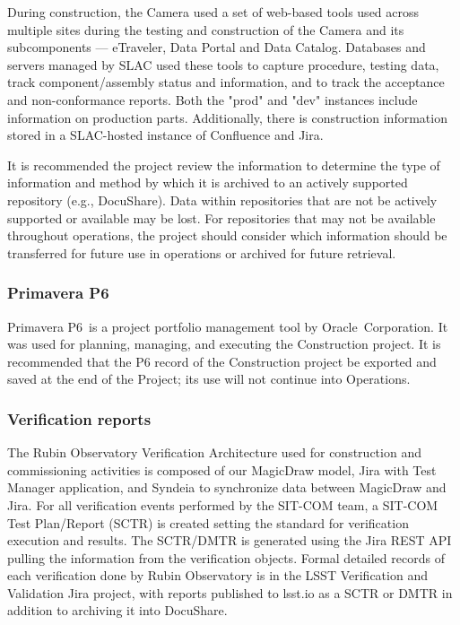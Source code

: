 During construction, the Camera used a set of web-based tools used across multiple sites during the testing and construction of the Camera and its subcomponents --- eTraveler, Data Portal and Data Catalog.
Databases and servers managed by SLAC used these tools to capture procedure, testing data, track component/assembly status and information, and to track the acceptance and non-conformance reports.
Both the "prod" and "dev" instances include information on production parts.
Additionally, there is construction information stored in a SLAC-hosted instance of Confluence and Jira.

It is recommended the project review the information to determine the type of information and method by which it is archived to an actively supported repository (e.g., DocuShare).
Data within repositories that are not be actively supported or available may be lost.
For repositories that may not be available throughout operations, the project should consider which information should be transferred for future use in operations or archived for future retrieval.

\subsubsection{Primavera P6}

Primavera P6\textregistered\ is a project portfolio management tool by Oracle\textregistered\ Corporation. \citep{P6-cite}
It was used for planning, managing, and executing the Construction project.
It is recommended that the P6 record of the Construction project be exported and saved at the end of the Project; its use will not continue into Operations.

\subsubsection{Verification reports}

The Rubin Observatory Verification Architecture used for construction and commissioning activities is composed of our MagicDraw model, Jira with Test Manager application, and Syndeia to synchronize data between MagicDraw and Jira.
For all verification events performed by the SIT-COM team, a SIT-COM Test Plan/Report (SCTR) is created setting the standard for verification execution and results.
The SCTR/DMTR is generated using the Jira REST API pulling the information from the verification objects.
Formal detailed records of each verification done by Rubin Observatory is in the LSST Verification and Validation Jira project, with reports published to lsst.io as a SCTR or DMTR in addition to archiving it into DocuShare.

